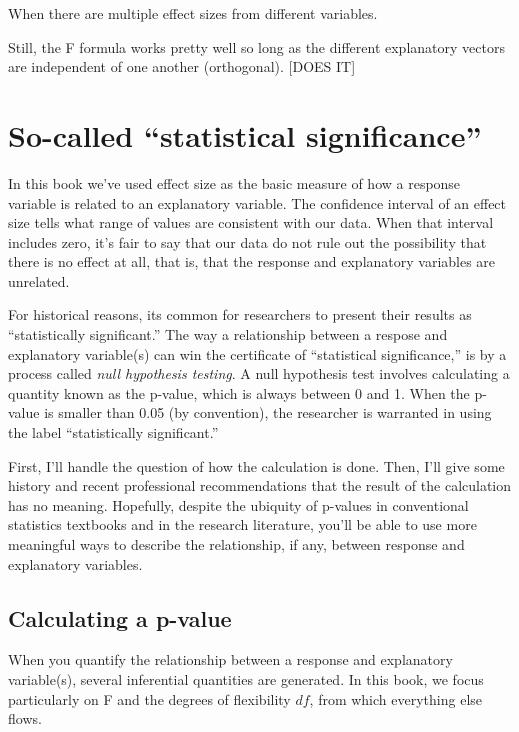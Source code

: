 \documentclass[]{book}
\begin{document}
When there are multiple effect sizes from different variables.

Still, the F formula works pretty well so long as the different explanatory vectors are independent of one another (orthogonal). {[}DOES IT{]}

\hypertarget{so-called-statistical-significance}{%
\chapter{So-called ``statistical significance''}\label{so-called-statistical-significance}}

In this book we've used effect size as the basic measure of how a response variable is related to an explanatory variable. The confidence interval of an effect size tells what range of values are consistent with our data. When that interval includes zero, it's fair to say that our data do not rule out the possibility that there is no effect at all, that is, that the response and explanatory variables are unrelated.

For historical reasons, its common for researchers to present their results as ``statistically significant.'' The way a relationship between a respose and explanatory variable(s) can win the certificate of ``statistical significance,'' is by a process called \emph{null hypothesis testing}. A null hypothesis test involves calculating a quantity known as the p-value, which is always between 0 and 1. When the p-value is smaller than 0.05 (by convention), the researcher is warranted in using the label ``statistically significant.''

First, I'll handle the question of how the calculation is done. Then, I'll give some history and recent professional recommendations that the result of the calculation has no meaning. Hopefully, despite the ubiquity of p-values in conventional statistics textbooks and in the research literature, you'll be able to use more meaningful ways to describe the relationship, if any, between response and explanatory variables.

\hypertarget{calculating-a-p-value}{%
\section{Calculating a p-value}\label{calculating-a-p-value}}

When you quantify the relationship between a response and explanatory variable(s), several inferential quantities are generated. In this book, we focus particularly on F and the degrees of flexibility \(df\), from which everything else flows.
\end{document}
